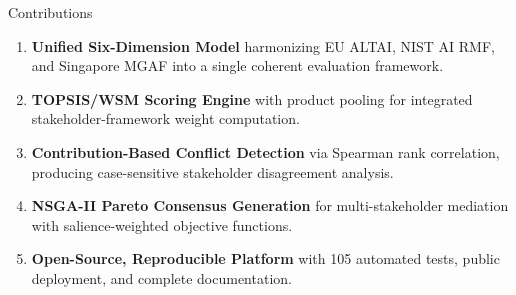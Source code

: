 \begin{frame}{Contributions}
    \begin{enumerate}
        \item \textbf{Unified Six-Dimension Model} harmonizing EU ALTAI, NIST AI RMF, and Singapore MGAF into a single coherent evaluation framework.
        \item \textbf{TOPSIS/WSM Scoring Engine} with product pooling for integrated stakeholder-framework weight computation.
        \item \textbf{Contribution-Based Conflict Detection} via Spearman rank correlation, producing case-sensitive stakeholder disagreement analysis.
        \item \textbf{NSGA-II Pareto Consensus Generation} for multi-stakeholder mediation with salience-weighted objective functions.
        \item \textbf{Open-Source, Reproducible Platform} with 105 automated tests, public deployment, and complete documentation.
    \end{enumerate}
\end{frame}
